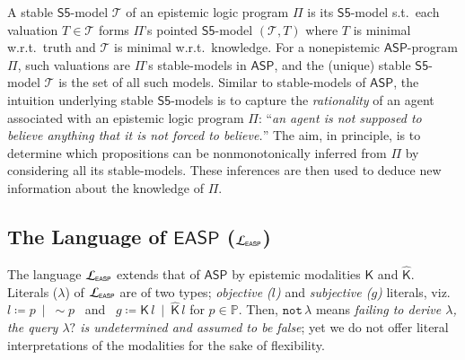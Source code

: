 \documentclass[submission,copyright,creativecommons]{eptcs}
\newcommand{\bnf}  { \coloneqq }
\newcommand{\lang}[1]  { {\cal L}_{#1} }
\newcommand{\classnot}  { {\sim} }
\newcommand{\Prop}  { \mathbb{P} }
\newcommand{\doublequotes}[1]  {``#1''}
\newcommand{\logic}[1]  { \ensuremath{\mathsf{#1}} }
\newcommand{\sfive}  { \logic{S5} }
\newcommand{\ASP}  { \logic{ASP} }
\newcommand{\EASP}  { \logic{EASP} }
\newcommand{\lpnot}  { \mathtt{not} \, }
\newcommand{\epispec}  { \Pi }
\newcommand{\K}  { \mathsf{K} }
\newcommand{\Khat}  { \hat{\mathsf{K}} }
\begin{document}
A stable $\sfive$-model $\mathcal T$ of an epistemic logic program $\epispec$ 
is its $\sfive$-model 
s.t.\ each valuation $T \in \mathcal T$ forms $\epispec$'s
pointed $\sfive$-model $(\mathcal T, T)$ where $T$ is minimal
w.r.t.\ truth and $\mathcal T$ is minimal w.r.t.\ knowledge.
For a nonepistemic $\ASP$-program $\epispec$, such valuations are $\epispec$'s
stable-models in $\ASP$, and the (unique) stable $\sfive$-model $\mathcal T$ is the set of all such models.
Similar to stable-models of $\ASP$, the intuition underlying stable $\sfive$-models  
is to capture the \emph{rationality} 
of an agent associated with an epistemic logic program
$\epispec$:
\doublequotes{\emph{an agent is not supposed to believe 
anything that it is not forced to believe.}}
The aim, in principle, is to determine which propositions can be 
nonmonotonically
inferred from $\epispec$ by considering all its stable-models.
These inferences are then used to deduce new information 
about the knowledge of $\epispec$. 

\subsection{The Language of \texorpdfstring{$\EASP$}{EASP}
 ($\lang{\scriptscriptstyle{\EASP}}$) }
\label{sec:Lang.EpisASP}
The language $\lang{\scriptscriptstyle{\EASP}}$
extends that of $\ASP$ by epistemic modalities $\K$ and $\Khat$.
Literals ($\lambda$) of $\lang{\scriptscriptstyle{\EASP}}$ are of two types;
\emph{objective ($l$)} and
\emph{subjective ($g$)} literals, viz.\,
$l \bnf p ~\mid~ \classnot p$ \, and \,
$g \bnf  \K\,l~\mid~ \Khat\,l$
for $p \in \Prop$. Then, $\lpnot \lambda$
means \emph{failing to derive $\lambda$, the query $\lambda ?$ is undetermined and 
assumed to be false}; yet we do not offer literal interpretations
of the modalities for the sake of flexibility.
\end{document}
